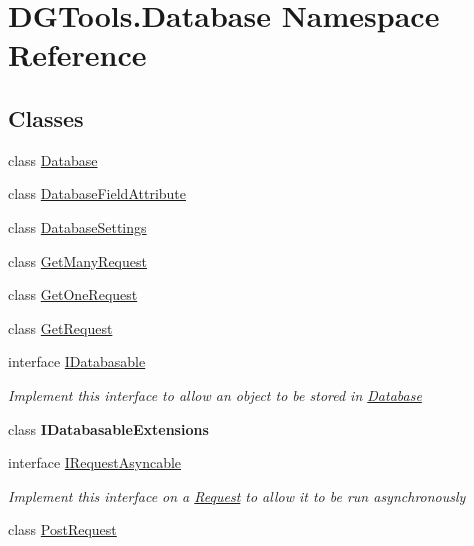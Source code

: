 \hypertarget{namespace_d_g_tools_1_1_database}{}\section{D\+G\+Tools.\+Database Namespace Reference}
\label{namespace_d_g_tools_1_1_database}
\subsection*{Classes}
\begin{DoxyCompactItemize}
\item 
class \mbox{\hyperlink{class_d_g_tools_1_1_database_1_1_database}{Database}}
\item 
class \mbox{\hyperlink{class_d_g_tools_1_1_database_1_1_database_field_attribute}{Database\+Field\+Attribute}}
\item 
class \mbox{\hyperlink{class_d_g_tools_1_1_database_1_1_database_settings}{Database\+Settings}}
\item 
class \mbox{\hyperlink{class_d_g_tools_1_1_database_1_1_get_many_request}{Get\+Many\+Request}}
\item 
class \mbox{\hyperlink{class_d_g_tools_1_1_database_1_1_get_one_request}{Get\+One\+Request}}
\item 
class \mbox{\hyperlink{class_d_g_tools_1_1_database_1_1_get_request}{Get\+Request}}
\item 
interface \mbox{\hyperlink{interface_d_g_tools_1_1_database_1_1_i_databasable}{I\+Databasable}}
\begin{DoxyCompactList}\small\item\em Implement this interface to allow an object to be stored in \mbox{\hyperlink{class_d_g_tools_1_1_database_1_1_database}{Database}} \end{DoxyCompactList}\item 
class {\bfseries I\+Databasable\+Extensions}
\item 
interface \mbox{\hyperlink{interface_d_g_tools_1_1_database_1_1_i_request_asyncable}{I\+Request\+Asyncable}}
\begin{DoxyCompactList}\small\item\em Implement this interface on a \mbox{\hyperlink{class_d_g_tools_1_1_database_1_1_request}{Request}} to allow it to be run asynchronously \end{DoxyCompactList}\item 
class \mbox{\hyperlink{class_d_g_tools_1_1_database_1_1_post_request}{Post\+Request}}
\item 

\end{DoxyCompactItemize}
